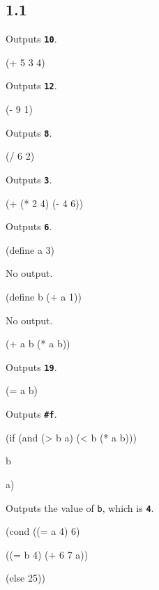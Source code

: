 \documentclass{article}
\begin{document}
\subsection*{1.1}

{}

Outputs \textbf{\texttt{10}}.

{\selectfont (+ 5 3 4)}

Outputs \textbf{\texttt{12}}.

{\selectfont (- 9 1)}

Outputs \textbf{\texttt{8}}.

{\selectfont (/ 6 2)}

Outputs \textbf{\texttt{3}}.

{\selectfont (+ (* 2 4) (- 4 6))}

Outputs \textbf{\texttt{6}}.

{\selectfont (define a 3)}

No output.

{\selectfont (define b (+ a 1))}

No output.

{\selectfont (+ a b (* a b))}

Outputs \textbf{\texttt{19}}.

{\selectfont (= a b)}

Outputs \textbf{\texttt{\#f}}.

{\selectfont (if (and (> b a) (< b (* a b)))

        \hspace{4\fontdimen2\font} b

        \hspace{4\fontdimen2\font} a)}

Outputs the value of \texttt{b}, which is \textbf{\texttt{4}}.

{\selectfont (cond ((= a 4) 6)

        \hspace{5\fontdimen2\font} ((= b 4) (+ 6 7 a))

        \hspace{5\fontdimen2\font} (else 25))}
\end{document}
